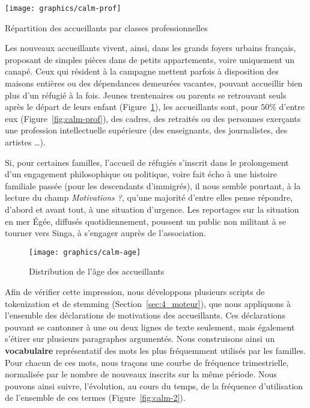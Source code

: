 \documentclass[symmetric,justified,marginals=raggedouter]{tufte-book}
\begin{document}
\begin{marginfigure}%
  \texttt{[image: graphics/calm-prof]}
  \vspace*{0.2cm}  
  \caption{Répartition des accueillants par classes professionnelles}
  \label{fig:calm-prof}
\end{marginfigure} 

Les nouveaux accueillants vivent, ainsi, dans les grands foyers urbains français, proposant de simples pièces dans de petits appartements, voire uniquement un canapé. Ceux qui résident à la campagne mettent parfois à disposition des maisons entières ou des dépendances demeurées vacantes, pouvant accueillir bien plus d'un réfugié à la fois. Jeunes trentenaires ou parents se retrouvant seuls après le départ de leurs enfant (Figure~\ref{fig:calm-age}), les accueillants sont, pour $50\%$ d'entre eux (Figure~\ref{fig:calm-prof}), des cadres, des retraités ou des personnes exerçants une profession intellectuelle supérieure (des enseignants, des journalistes, des artistes …).

Si, pour certaines familles, l'accueil de réfugiés s'inscrit dans le prolongement d'un engagement philosophique ou politique, voire fait écho à une histoire familiale passée (pour les descendants d'immigrés), il nous semble pourtant, à la lecture du champ \textit{Motivations ?}, qu'une majorité d'entre elles pense répondre, d'abord et avant tout, à une situation d'urgence. Les reportages sur la situation en mer Égée, diffusés quotidiennement, poussent un public non militant à se tourner vers Singa, à s'engager auprès de l'association. 

\begin{figure}
  \texttt{[image: graphics/calm-age]}
  \caption{Distribution de l'âge des accueillants}
  \label{fig:calm-age}
\end{figure} 

\noindent Afin de vérifier cette impression, nous développons plusieurs scripts de tokenization et de stemming (Section~\ref{sec:4_moteur}), que nous appliquons à l'ensemble des déclarations de motivations des accueillants. Ces déclarations pouvant se cantonner à une ou deux lignes de texte seulement, mais également s'étirer sur plusieurs paragraphes argumentés. Nous construisons ainsi un \textbf{vocabulaire} représentatif des mots les plus fréquemment utilisés par les familles. Pour chacun de ces mots, nous traçons une courbe de fréquence trimestrielle, normalisée par le nombre de nouveaux inscrits sur la même période. Nous pouvons ainsi suivre, l'évolution, au cours du temps, de la fréquence d'utilisation de l'ensemble de ces termes (Figure~\ref{fig:calm-2}).
\end{document}
